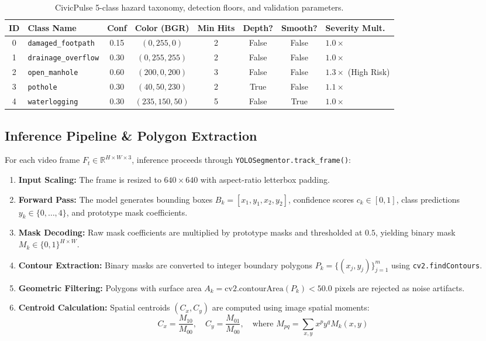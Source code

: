 \documentclass[11pt,a4paper]{article}
\begin{document}
\begin{table}[htbp]
\centering
\small
\caption{CivicPulse 5-class hazard taxonomy, detection floors, and validation parameters.}
\label{tab:class_taxonomy}
\begin{tabularx}{\textwidth}{c l c c c c c X}
\toprule
\textbf{ID} & \textbf{Class Name} & \textbf{Conf} & \textbf{Color (BGR)} & \textbf{Min Hits} & \textbf{Depth?} & \textbf{Smooth?} & \textbf{Severity Mult.} \\
\midrule
0 & \texttt{damaged\_footpath} & 0.15 & $(0, 255, 0)$ & 2 & False & False & $1.0\times$ \\
1 & \texttt{drainage\_overflow} & 0.30 & $(0, 255, 255)$ & 2 & False & False & $1.0\times$ \\
2 & \texttt{open\_manhole} & 0.60 & $(200, 0, 200)$ & 3 & False & False & $1.3\times$ (High Risk) \\
3 & \texttt{pothole} & 0.30 & $(40, 50, 230)$ & 2 & True & False & $1.1\times$ \\
4 & \texttt{waterlogging} & 0.30 & $(235, 150, 50)$ & 5 & False & True & $1.0\times$ \\
\bottomrule
\end{tabularx}
\end{table}

\subsection{Inference Pipeline \& Polygon Extraction}
For each video frame $F_t \in \mathbb{R}^{H \times W \times 3}$, inference proceeds through \texttt{YOLOSegmentor.track\_frame()}:
\begin{enumerate}[leftmargin=*]
    \item \textbf{Input Scaling:} The frame is resized to $640\times 640$ with aspect-ratio letterbox padding.
    \item \textbf{Forward Pass:} The model generates bounding boxes $B_k = [x_1, y_1, x_2, y_2]$, confidence scores $c_k \in [0, 1]$, class predictions $y_k \in \{0,\dots,4\}$, and prototype mask coefficients.
    \item \textbf{Mask Decoding:} Raw mask coefficients are multiplied by prototype masks and thresholded at $0.5$, yielding binary mask $M_k \in \{0, 1\}^{H \times W}$.
    \item \textbf{Contour Extraction:} Binary masks are converted to integer boundary polygons $P_k = \{(x_j, y_j)\}_{j=1}^m$ using \texttt{cv2.findContours}.
    \item \textbf{Geometric Filtering:} Polygons with surface area $A_k = \text{cv2.contourArea}(P_k) < 50.0\text{ pixels}$ are rejected as noise artifacts.
    \item \textbf{Centroid Calculation:} Spatial centroids $(C_x, C_y)$ are computed using image spatial moments:
    \begin{equation}
    C_x = \frac{M_{10}}{M_{00}}, \quad C_y = \frac{M_{01}}{M_{00}}, \quad \text{where } M_{pq} = \sum_{x,y} x^p y^q M_k(x, y)
    \end{equation}
\end{enumerate}
\end{document}
